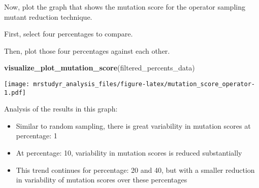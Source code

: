 \documentclass[]{article}
\newenvironment{Shaded}{}{}
\newcommand{\KeywordTok}[1]{\textcolor[rgb]{0.00,0.44,0.13}{\textbf{{#1}}}}
\newcommand{\DecValTok}[1]{\textcolor[rgb]{0.25,0.63,0.44}{{#1}}}
\newcommand{\StringTok}[1]{\textcolor[rgb]{0.25,0.44,0.63}{{#1}}}
\newcommand{\NormalTok}[1]{{#1}}
\providecommand{\tightlist}{%
  \setlength{\itemsep}{0pt}\setlength{\parskip}{0pt}}
\begin{document}
Now, plot the graph that shows the mutation score for the operator
sampling mutant reduction technique.

First, select four percentages to compare.

\begin{Shaded}
\end{Shaded}

Then, plot those four percentages against each other.

\begin{Shaded}
\begin{Highlighting}[]
\KeywordTok{visualize_plot_mutation_score}\NormalTok{(filtered_percents_data)}
\end{Highlighting}
\end{Shaded}

\texttt{[image: mrstudyr\_analysis\_files/figure-latex/mutation\_score\_operator-1.pdf]}

Analysis of the results in this graph:

\begin{itemize}
\tightlist
\item
  Similar to random sampling, there is great variability in mutation
  scores at percentage: 1
\item
  At percentage: 10, variability in mutation scores is reduced
  substantially
\item
  This trend continues for percentage: 20 and 40, but with a smaller
  reduction in variability of mutation scores over these percentages
\end{itemize}
\end{document}
